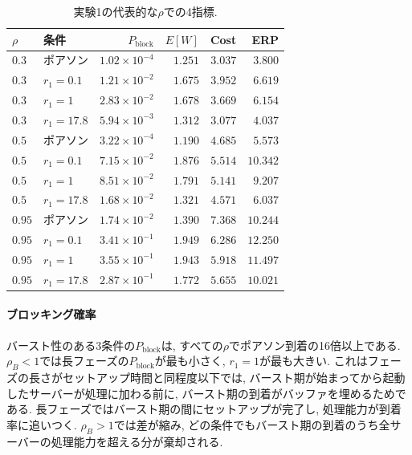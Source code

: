 \documentclass[a4paper, 11pt, dvipdfmx]{jsreport}
\begin{document}
\begin{table}[H]
\centering
\caption{実験1の代表的な$\rho$での4指標.}
\label{tab:exp1-values}
\small
\begin{tabular}{llrrrr}
\toprule
$\rho$ & 条件 & $P_{\mathrm{block}}$ & $E[W]$ & Cost & ERP \\
\midrule
$0.3$ & ポアソン & $1.02 \times 10^{-4}$ & $1.251$ & $3.037$ & $3.800$ \\
$0.3$ & $r_1=0.1$ & $1.21 \times 10^{-2}$ & $1.675$ & $3.952$ & $6.619$ \\
$0.3$ & $r_1=1$ & $2.83 \times 10^{-2}$ & $1.678$ & $3.669$ & $6.154$ \\
$0.3$ & $r_1=17.8$ & $5.94 \times 10^{-3}$ & $1.312$ & $3.077$ & $4.037$ \\
\midrule
$0.5$ & ポアソン & $3.22 \times 10^{-4}$ & $1.190$ & $4.685$ & $5.573$ \\
$0.5$ & $r_1=0.1$ & $7.15 \times 10^{-2}$ & $1.876$ & $5.514$ & $10.342$ \\
$0.5$ & $r_1=1$ & $8.51 \times 10^{-2}$ & $1.791$ & $5.141$ & $9.207$ \\
$0.5$ & $r_1=17.8$ & $1.68 \times 10^{-2}$ & $1.321$ & $4.571$ & $6.037$ \\
\midrule
$0.95$ & ポアソン & $1.74 \times 10^{-2}$ & $1.390$ & $7.368$ & $10.244$ \\
$0.95$ & $r_1=0.1$ & $3.41 \times 10^{-1}$ & $1.949$ & $6.286$ & $12.250$ \\
$0.95$ & $r_1=1$ & $3.55 \times 10^{-1}$ & $1.943$ & $5.918$ & $11.497$ \\
$0.95$ & $r_1=17.8$ & $2.87 \times 10^{-1}$ & $1.772$ & $5.655$ & $10.021$ \\
\bottomrule
\end{tabular}
\end{table}

\paragraph{ブロッキング確率}
バースト性のある3条件の$P_{\mathrm{block}}$は, すべての$\rho$でポアソン到着の16倍以上である.
$\rho_B < 1$では長フェーズの$P_{\mathrm{block}}$が最も小さく, $r_1 = 1$が最も大きい.
これはフェーズの長さがセットアップ時間と同程度以下では, バースト期が始まってから起動したサーバーが処理に加わる前に,
バースト期の到着がバッファを埋めるためである. 長フェーズではバースト期の間にセットアップが完了し,
処理能力が到着率に追いつく. $\rho_B > 1$では差が縮み, どの条件でもバースト期の到着のうち全サーバーの処理能力を超える分が棄却される.
\end{document}
